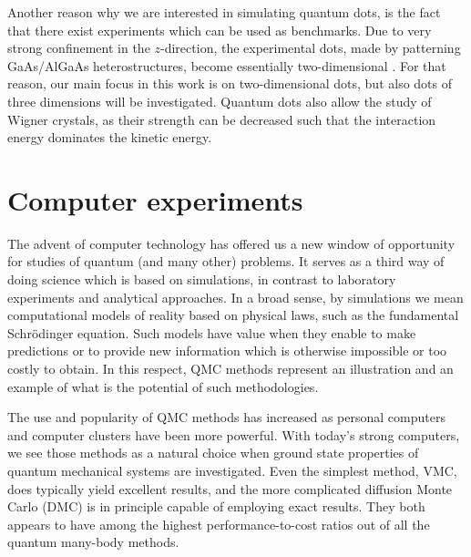 Another reason why we are interested in simulating quantum dots, is the fact that there exist experiments which can be used as benchmarks. Due to very strong confinement in the $z$-direction, the experimental dots, made by patterning GaAs/AlGaAs heterostructures, become essentially two-dimensional \cite{marzin_photoluminescence_1994,brunner_sharp-line_1994}. For that reason, our main focus in this work is on two-dimensional dots, but also dots of three dimensions will be investigated. Quantum dots also allow the study of Wigner crystals, as their strength can be decreased such that the interaction energy dominates the kinetic energy. 

\section{Computer experiments}
The advent of computer technology has offered us a new window of opportunity for studies of quantum (and many other) problems. It serves as a third way of doing science which is based on simulations, in contrast to laboratory experiments and analytical approaches. In a broad sense, by simulations we mean computational models of reality based on physical laws, such as the fundamental Schrödinger equation. Such models have value when they enable to make predictions or to provide new information which is otherwise impossible or too costly to obtain. In this respect, QMC methods represent an illustration and an example of what is the potential of such methodologies.

The use and popularity of QMC methods has increased as personal computers and computer clusters have been more powerful. With today's strong computers, we see those methods as a natural choice when ground state properties of quantum mechanical systems are investigated. Even the simplest method, VMC, does typically yield excellent results, and the more complicated diffusion Monte Carlo (DMC) is in principle capable of employing exact results. They both appears to have among the highest performance-to-cost ratios out of all the quantum many-body methods. 


